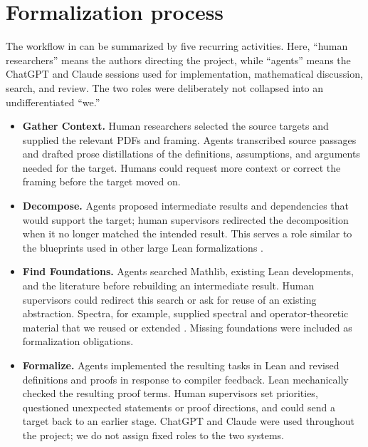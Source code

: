 \documentclass{article}
\begin{document}
\section{Formalization process}
\label{sec:system}

The workflow in  can be summarized by five recurring
activities.  Here, ``human researchers'' means the authors directing the
project, while ``agents'' means the ChatGPT and Claude sessions used for
implementation, mathematical discussion, search, and review.  The two roles
were deliberately not collapsed into an undifferentiated ``we.''

\begin{itemize}
\setlength{\itemsep}{0.25em}
\item \textbf{Gather Context.}  Human researchers selected the source
  targets and supplied the relevant PDFs and framing.  Agents transcribed
  source passages and drafted prose distillations of the definitions,
  assumptions, and arguments needed for the target.  Humans could request more
  context or correct the framing before the target moved on.

\item \textbf{Decompose.}  Agents proposed intermediate results and
  dependencies that would support the target; human supervisors redirected the
  decomposition when it no longer matched the intended result.  This serves a
  role similar to the blueprints used in other large Lean formalizations
  \citep{liquidblueprint2023,pfrblueprint2024,zhu2026leanarchitect}.

\item \textbf{Find Foundations.}  Agents searched Mathlib, existing Lean
  developments, and the literature before rebuilding an intermediate result.
  Human supervisors could redirect this search or ask for reuse of an existing
  abstraction.  Spectra, for example, supplied spectral and operator-theoretic
  material that we reused or extended \citep{bornemann2026spectra}.  Missing
  foundations were included as formalization obligations.

\item \textbf{Formalize.}  Agents implemented the resulting tasks in Lean and
  revised definitions and proofs in response to compiler feedback.  Lean
  mechanically checked the resulting proof terms.  Human supervisors set
  priorities, questioned unexpected statements or proof directions, and could
  send a target back to an earlier stage.  ChatGPT and Claude were used
  throughout the project; we do not assign fixed roles to the two systems.


\end{itemize}
\end{document}
